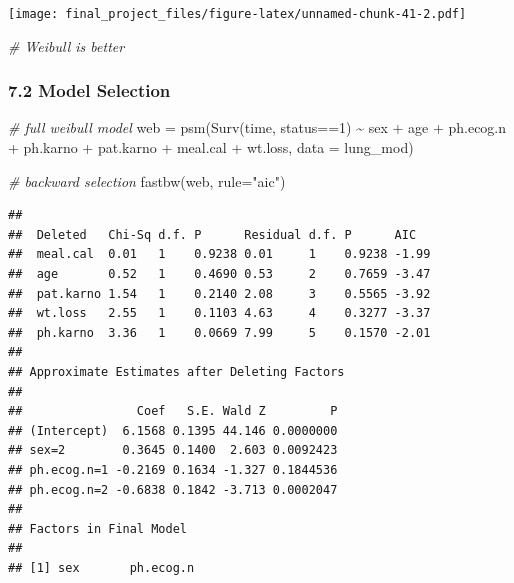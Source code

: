 \documentclass[
]{article}
\newenvironment{Shaded}{\begin{snugshade}}{\end{snugshade}}
\newcommand{\AttributeTok}[1]{\textcolor[rgb]{0.77,0.63,0.00}{#1}}
\newcommand{\CommentTok}[1]{\textcolor[rgb]{0.56,0.35,0.01}{\textit{#1}}}
\newcommand{\DecValTok}[1]{\textcolor[rgb]{0.00,0.00,0.81}{#1}}
\newcommand{\FunctionTok}[1]{\textcolor[rgb]{0.00,0.00,0.00}{#1}}
\newcommand{\NormalTok}[1]{#1}
\newcommand{\OtherTok}[1]{\textcolor[rgb]{0.56,0.35,0.01}{#1}}
\newcommand{\SpecialCharTok}[1]{\textcolor[rgb]{0.00,0.00,0.00}{#1}}
\newcommand{\StringTok}[1]{\textcolor[rgb]{0.31,0.60,0.02}{#1}}
\begin{document}
\texttt{[image: final\_project\_files/figure-latex/unnamed-chunk-41-2.pdf]}

\begin{Shaded}
\begin{Highlighting}[]
\CommentTok{\# Weibull is better}
\end{Highlighting}
\end{Shaded}

\hypertarget{model-selection}{%
\subsubsection{7.2 Model Selection}\label{model-selection}}

\begin{Shaded}
\begin{Highlighting}[]
\CommentTok{\# full weibull model}
\NormalTok{web }\OtherTok{=} \FunctionTok{psm}\NormalTok{(}\FunctionTok{Surv}\NormalTok{(time, status}\SpecialCharTok{==}\DecValTok{1}\NormalTok{) }\SpecialCharTok{\textasciitilde{}}\NormalTok{ sex }\SpecialCharTok{+}\NormalTok{ age }\SpecialCharTok{+}\NormalTok{ ph.ecog.n }\SpecialCharTok{+}\NormalTok{ ph.karno }\SpecialCharTok{+}\NormalTok{ pat.karno }\SpecialCharTok{+}\NormalTok{ meal.cal }\SpecialCharTok{+}\NormalTok{ wt.loss, }\AttributeTok{data =}\NormalTok{ lung\_mod)}

\CommentTok{\# backward selection}
\FunctionTok{fastbw}\NormalTok{(web, }\AttributeTok{rule=}\StringTok{"aic"}\NormalTok{)}
\end{Highlighting}
\end{Shaded}

\begin{verbatim}
## 
##  Deleted   Chi-Sq d.f. P      Residual d.f. P      AIC  
##  meal.cal  0.01   1    0.9238 0.01     1    0.9238 -1.99
##  age       0.52   1    0.4690 0.53     2    0.7659 -3.47
##  pat.karno 1.54   1    0.2140 2.08     3    0.5565 -3.92
##  wt.loss   2.55   1    0.1103 4.63     4    0.3277 -3.37
##  ph.karno  3.36   1    0.0669 7.99     5    0.1570 -2.01
## 
## Approximate Estimates after Deleting Factors
## 
##                Coef   S.E. Wald Z         P
## (Intercept)  6.1568 0.1395 44.146 0.0000000
## sex=2        0.3645 0.1400  2.603 0.0092423
## ph.ecog.n=1 -0.2169 0.1634 -1.327 0.1844536
## ph.ecog.n=2 -0.6838 0.1842 -3.713 0.0002047
## 
## Factors in Final Model
## 
## [1] sex       ph.ecog.n
\end{verbatim}
\end{document}

